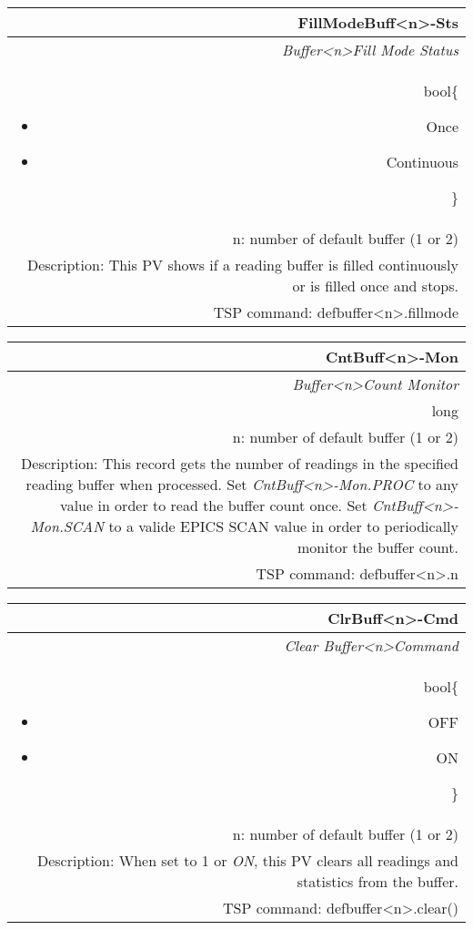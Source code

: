 \documentclass[openany]{article}
\begin{document}
		\begin{tabular}{N}
			\hline
			\bfseries FillModeBuff\textless n\textgreater-Sts\label{pv:fillmodebuff-sts} \\ \hline
			\emph{Buffer\textless n\textgreater Fill Mode Status} \\
			bool\{\begin{itemize}[noitemsep]
				\small
				\item[] Once
				\item[] Continuous
			\end{itemize}\} \\
			n: number of default buffer (1 or 2) \\
			Description: This PV shows if a reading buffer is filled continuously or is filled once and stops. \\
			TSP command: defbuffer\textless n\textgreater.fillmode
		\end{tabular}

		\begin{tabular}{N}
			\hline
			\bfseries CntBuff\textless n\textgreater-Mon\label{pv:cntbuff-mon} \\ \hline
			\emph{Buffer\textless n\textgreater Count Monitor} \\
			long \\
			n: number of default buffer (1 or 2) \\
			Description: This record gets the number of readings in the specified reading buffer when processed. Set \emph{CntBuff\textless n\textgreater-Mon.PROC} to any value in order to read the buffer count once. Set \emph{CntBuff\textless n\textgreater-Mon.SCAN} to a valide EPICS SCAN value in order to periodically monitor the buffer count. \\
			TSP command: defbuffer\textless n\textgreater.n
		\end{tabular}

		\begin{tabular}{N}
			\hline
			\bfseries ClrBuff\textless n\textgreater-Cmd\label{pv:clrbuff-cmd} \\ \hline
			\emph{Clear Buffer\textless n\textgreater Command} \\
			bool\{\begin{itemize}[noitemsep]
				\small
				\item[] OFF
				\item[] ON
			\end{itemize}\} \\
			n: number of default buffer (1 or 2) \\
			Description: When set to 1 or \emph{ON}, this PV clears all readings and statistics from the buffer. \\
			TSP command: defbuffer\textless n\textgreater.clear()
		\end{tabular}
\end{document}
